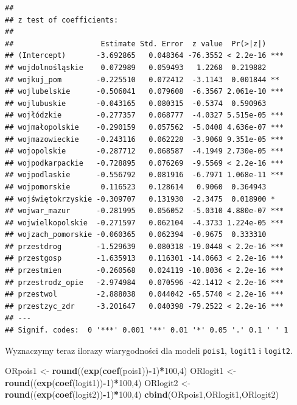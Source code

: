 \documentclass[polish,]{book}
\newenvironment{Shaded}{\begin{snugshade}}{\end{snugshade}}
\newcommand{\DecValTok}[1]{\textcolor[rgb]{0.00,0.00,0.81}{#1}}
\newcommand{\KeywordTok}[1]{\textcolor[rgb]{0.13,0.29,0.53}{\textbf{#1}}}
\newcommand{\NormalTok}[1]{#1}
\newcommand{\OperatorTok}[1]{\textcolor[rgb]{0.81,0.36,0.00}{\textbf{#1}}}
\newcommand{\StringTok}[1]{\textcolor[rgb]{0.31,0.60,0.02}{#1}}
\begin{document}
\begin{verbatim}
## 
## z test of coefficients:
## 
##                    Estimate Std. Error  z value  Pr(>|z|)    
## (Intercept)       -3.692865   0.048364 -76.3552 < 2.2e-16 ***
## wojdolnośląskie    0.072989   0.059493   1.2268  0.219882    
## wojkuj_pom        -0.225510   0.072412  -3.1143  0.001844 ** 
## wojlubelskie      -0.506041   0.079608  -6.3567 2.061e-10 ***
## wojlubuskie       -0.043165   0.080315  -0.5374  0.590963    
## wojłódzkie        -0.277357   0.068777  -4.0327 5.515e-05 ***
## wojmałopolskie    -0.290159   0.057562  -5.0408 4.636e-07 ***
## wojmazowieckie    -0.243116   0.062228  -3.9068 9.351e-05 ***
## wojopolskie       -0.287712   0.068587  -4.1949 2.730e-05 ***
## wojpodkarpackie   -0.728895   0.076269  -9.5569 < 2.2e-16 ***
## wojpodlaskie      -0.556792   0.081916  -6.7971 1.068e-11 ***
## wojpomorskie       0.116523   0.128614   0.9060  0.364943    
## wojświętokrzyskie -0.309707   0.131930  -2.3475  0.018900 *  
## wojwar_mazur      -0.281995   0.056052  -5.0310 4.880e-07 ***
## wojwielkopolskie  -0.271597   0.062104  -4.3733 1.224e-05 ***
## wojzach_pomorskie -0.060365   0.062394  -0.9675  0.333310    
## przestdrog        -1.529639   0.080318 -19.0448 < 2.2e-16 ***
## przestgosp        -1.635913   0.116301 -14.0663 < 2.2e-16 ***
## przestmien        -0.260568   0.024119 -10.8036 < 2.2e-16 ***
## przestrodz_opie   -2.974984   0.070596 -42.1412 < 2.2e-16 ***
## przestwol         -2.888038   0.044042 -65.5740 < 2.2e-16 ***
## przestzyc_zdr     -3.201647   0.040398 -79.2522 < 2.2e-16 ***
## ---
## Signif. codes:  0 '***' 0.001 '**' 0.01 '*' 0.05 '.' 0.1 ' ' 1
\end{verbatim}

Wyznaczymy teraz ilorazy wiarygodności dla modeli \texttt{pois1}, \texttt{logit1} i \texttt{logit2}.

\begin{Shaded}
\begin{Highlighting}[]
\NormalTok{ORpois1 <-}\StringTok{ }\KeywordTok{round}\NormalTok{((}\KeywordTok{exp}\NormalTok{(}\KeywordTok{coef}\NormalTok{(pois1))}\OperatorTok{-}\DecValTok{1}\NormalTok{)}\OperatorTok{*}\DecValTok{100}\NormalTok{,}\DecValTok{4}\NormalTok{)}
\NormalTok{ORlogit1 <-}\StringTok{ }\KeywordTok{round}\NormalTok{((}\KeywordTok{exp}\NormalTok{(}\KeywordTok{coef}\NormalTok{(logit1))}\OperatorTok{-}\DecValTok{1}\NormalTok{)}\OperatorTok{*}\DecValTok{100}\NormalTok{,}\DecValTok{4}\NormalTok{)}
\NormalTok{ORlogit2 <-}\StringTok{ }\KeywordTok{round}\NormalTok{((}\KeywordTok{exp}\NormalTok{(}\KeywordTok{coef}\NormalTok{(logit2))}\OperatorTok{-}\DecValTok{1}\NormalTok{)}\OperatorTok{*}\DecValTok{100}\NormalTok{,}\DecValTok{4}\NormalTok{)}
\KeywordTok{cbind}\NormalTok{(ORpois1,ORlogit1,ORlogit2)}
\end{Highlighting}
\end{Shaded}
\end{document}
